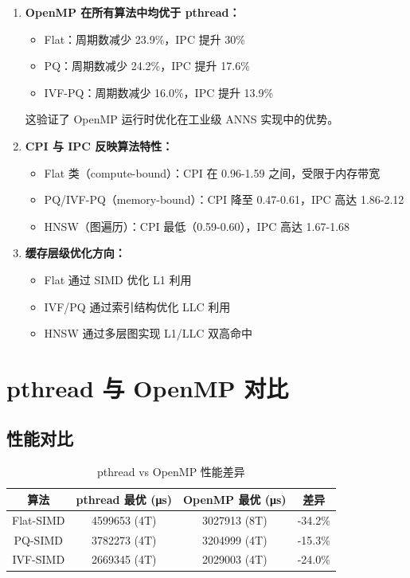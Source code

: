 \documentclass[a4paper]{article}
\begin{document}
\begin{enumerate}
\item \textbf{OpenMP 在所有算法中均优于 pthread：}
\begin{itemize}
\item Flat：周期数减少 23.9\%，IPC 提升 30\%
\item PQ：周期数减少 24.2\%，IPC 提升 17.6\%
\item IVF-PQ：周期数减少 16.0\%，IPC 提升 13.9\%
\end{itemize}
这验证了 OpenMP 运行时优化在工业级 ANNS 实现中的优势。

\item \textbf{CPI 与 IPC 反映算法特性：}
\begin{itemize}
\item Flat 类（compute-bound）：CPI 在 0.96-1.59 之间，受限于内存带宽
\item PQ/IVF-PQ（memory-bound）：CPI 降至 0.47-0.61，IPC 高达 1.86-2.12
\item HNSW（图遍历）：CPI 最低（0.59-0.60），IPC 高达 1.67-1.68
\end{itemize}

\item \textbf{缓存层级优化方向：}
\begin{itemize}
\item Flat 通过 SIMD 优化 L1 利用
\item IVF/PQ 通过索引结构优化 LLC 利用
\item HNSW 通过多层图实现 L1/LLC 双高命中
\end{itemize}
\end{enumerate}

\section{pthread 与 OpenMP 对比}

\subsection{性能对比}

\begin{table}[htbp]
\centering
\caption{pthread vs OpenMP 性能差异}
\begin{tabular}{cccc}
\toprule
算法 & pthread 最优 (μs) & OpenMP 最优 (μs) & 差异 \\
\midrule
Flat-SIMD & 4599653 (4T) & 3027913 (8T) & -34.2\% \\
PQ-SIMD & 3782273 (4T) & 3204999 (4T) & -15.3\% \\
IVF-SIMD & 2669345 (4T) & 2029003 (4T) & -24.0\% \\
\bottomrule
\end{tabular}
\end{table}
\end{document}
